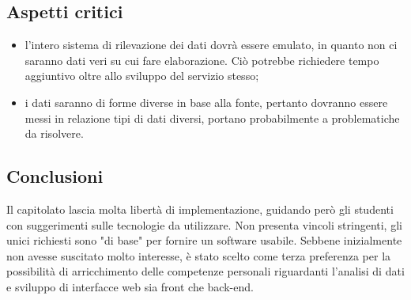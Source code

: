 \subsection{Aspetti critici}
\begin{itemize}
    \item l'intero sistema di rilevazione dei dati dovrà essere emulato, in quanto non ci saranno dati veri su cui fare elaborazione. Ciò potrebbe richiedere tempo aggiuntivo oltre allo sviluppo del servizio stesso;
    \item i dati saranno di forme diverse in base alla fonte, pertanto dovranno essere messi in relazione tipi di dati diversi, portano probabilmente a problematiche da risolvere.
\end{itemize}
\subsection{Conclusioni}
Il capitolato lascia molta libertà di implementazione, guidando per\`{o} gli studenti con suggerimenti sulle tecnologie da utilizzare.
Non presenta vincoli stringenti, gli unici richiesti sono "di base" per fornire un software usabile.
Sebbene inizialmente non avesse suscitato molto interesse, è stato scelto come terza preferenza per la possibilità di arricchimento delle competenze personali
riguardanti l'analisi di dati e sviluppo di interfacce web sia front che back-end.
